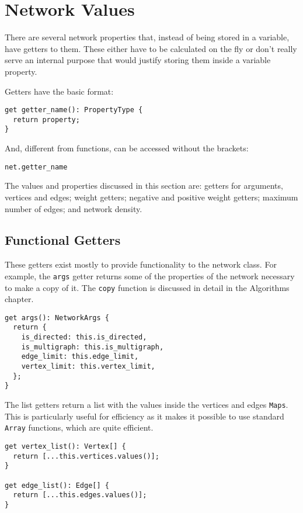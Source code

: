 \chapter{Network Values}

There are several network properties that, instead of being stored in a variable,
have getters to them.
These either have to be calculated on the fly or don't really serve an internal
purpose that would justify storing them inside a variable property.

Getters have the basic format:

\begin{verbatim}
get getter_name(): PropertyType {
  return property;
}
\end{verbatim}

And, different from functions, can be accessed without the brackets:

\begin{verbatim}
net.getter_name
\end{verbatim}

The values and properties discussed in this section are:
getters for arguments, vertices and edges; weight getters;
negative and positive weight getters; maximum number of edges; and
network density.

\section{Functional Getters}
These getters exist mostly to provide functionality to the network class.
For example,
the \texttt{args} getter returns some of the properties of the network necessary to make a copy of it.
The \texttt{copy} function is discussed in detail in the Algorithms chapter.

\begin{verbatim}
get args(): NetworkArgs {
  return {
    is_directed: this.is_directed,
    is_multigraph: this.is_multigraph,
    edge_limit: this.edge_limit,
    vertex_limit: this.vertex_limit,
  };
}
\end{verbatim}

The list getters return a list with the values inside the vertices and edges \texttt{Maps}.
This is particularly useful for efficiency as it makes it possible to use standard \texttt{Array} functions,
which are quite efficient.

\begin{verbatim}
get vertex_list(): Vertex[] {
  return [...this.vertices.values()];
}

get edge_list(): Edge[] {
  return [...this.edges.values()];
}
\end{verbatim}

